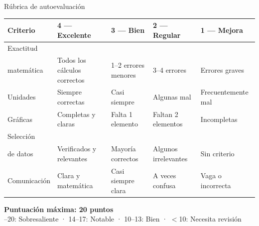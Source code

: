 \documentclass[aspectratio=169, 10pt, spanish]{beamer}
\begin{document}

\begin{frame}{Rúbrica de autoevaluación}
  \begin{center}
  \AlmFontFootnote
  \begin{tabular}{p{2cm} p{2.5cm} p{2.5cm} p{2.5cm} p{2.5cm}}
    \toprule
    \textbf{Criterio}
      & \textbf{4 — Excelente}
      & \textbf{3 — Bien}
      & \textbf{2 — Regular}
      & \textbf{1 — Mejora}\\
    \midrule
    Exactitud\\matemática
      & Todos los cálculos correctos
      & 1--2 errores menores
      & 3--4 errores
      & Errores graves\\[4pt]
    Unidades
      & Siempre correctas
      & Casi siempre
      & Algunas mal
      & Frecuentemente mal\\[4pt]
    Gráficas
      & Completas y claras
      & Falta 1 elemento
      & Faltan 2 elementos
      & Incompletas\\[4pt]
    Selección\\de datos
      & Verificados y relevantes
      & Mayoría correctos
      & Algunos irrelevantes
      & Sin criterio\\[4pt]
    Comunicación
      & Clara y matemática
      & Casi siempre clara
      & A veces confusa
      & Vaga o incorrecta\\
    \bottomrule
  \end{tabular}
  \end{center}
  \vspace{4pt}
  \begin{center}
    \AlmFontSmall\textbf{Puntuación máxima: 20 puntos}\\
    {--20: Sobresaliente · 14--17: Notable ·
    10--13: Bien · $<$10: Necesita revisión}
  \end{center}
\end{frame}

\end{document}
